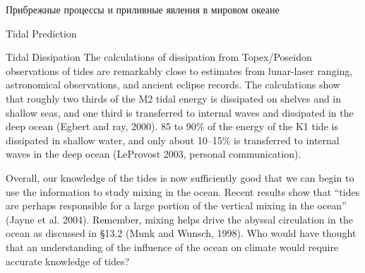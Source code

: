 \begin{chapter}{Прибрежные процессы и приливные явления в мировом океане}
\begin{section}{Tidal Prediction}
\begin{paragraph}{Tidal Dissipation}
The calculations of dissipation from
Topex/Poseidon
observations of tides are remarkably close to estimates from
lunar-laser ranging, astronomical observations, and ancient eclipse
records. The calculations show that roughly two thirds of the M2 tidal
energy is dissipated on shelves and in shallow seas, and one third is
transferred to internal waves and dissipated in the deep ocean (Egbert
and ray, 2000). 85 to 90\% of the energy of the K1 tide is dissipated
in shallow water, and only about 10--15\% is transferred to internal
waves in the deep ocean (LeProvost 2003, personal communication).
%

Overall, our knowledge of the tides is now sufficiently good that we
can begin to use the information to study mixing
in the ocean. Recent results show that ``tides are perhaps responsible
for a large portion of the vertical mixing in the ocean'' (Jayne et
al. 2004). Remember, mixing helps drive the abyssal
circulation in the ocean as discussed in \S 13.2 (Munk and
Wunsch, 1998). Who would have thought that an understanding of the
influence of the ocean on climate would require accurate knowledge of
tides?
%
\end{paragraph}
\end{section}


\end{chapter}
